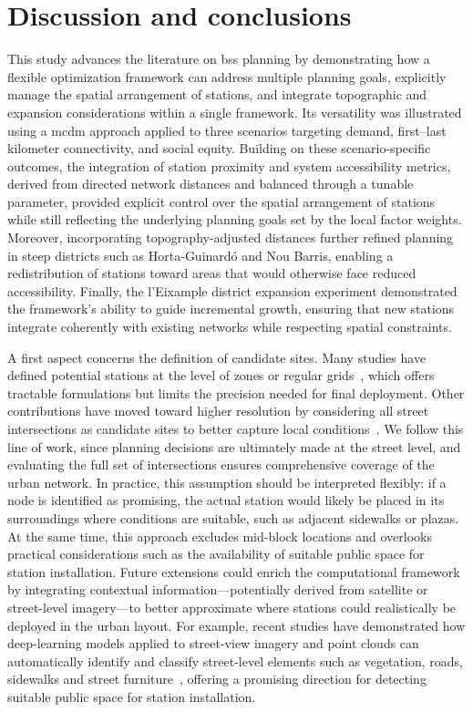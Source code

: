 \section{Discussion and conclusions}

This study advances the literature on \ac{bss} planning by demonstrating how a flexible optimization framework can address multiple planning goals, explicitly manage the spatial arrangement of stations, and integrate topographic and expansion considerations within a single framework. Its versatility was illustrated using a \ac{mcdm} approach applied to three scenarios targeting demand, first–last kilometer connectivity, and social equity. Building on these scenario-specific outcomes, the integration of station proximity and system accessibility metrics, derived from directed network distances and balanced through a tunable parameter, provided explicit control over the spatial arrangement of stations while still reflecting the underlying planning goals set by the local factor weights. Moreover, incorporating topography-adjusted distances further refined planning in steep districts such as Horta-Guinardó and Nou Barris, enabling a redistribution of stations toward areas that would otherwise face reduced accessibility. Finally, the l’Eixample district expansion experiment demonstrated the framework’s ability to guide incremental growth, ensuring that new stations integrate coherently with existing networks while respecting spatial constraints.

A first aspect concerns the definition of candidate sites. Many studies have defined potential stations at the level of zones or regular grids~\cite{Frade2015, Mete2018, Fazio2021, Veillette2018, Tera2023}, which offers tractable formulations but limits the precision needed for final deployment. Other contributions have moved toward higher resolution by considering all street intersections as candidate sites to better capture local conditions~\cite{Cintrano2018, Xin2013}. We follow this line of work, since planning decisions are ultimately made at the street level, and evaluating the full set of intersections ensures comprehensive coverage of the urban network. In practice, this assumption should be interpreted flexibly: if a node is identified as promising, the actual station would likely be placed in its surroundings where conditions are suitable, such as adjacent sidewalks or plazas. At the same time, this approach excludes mid-block locations and overlooks practical considerations such as the availability of suitable public space for station installation. Future extensions could enrich the computational framework by integrating contextual information—potentially derived from satellite or street-level imagery—to better approximate where stations could realistically be deployed in the urban layout. For example, recent studies have demonstrated how deep-learning models applied to street-view imagery and point clouds can automatically identify and classify street-level elements such as vegetation, roads, sidewalks and street furniture~\cite{Ning2022, Zhou2022}, offering a promising direction for detecting suitable public space for station installation.

